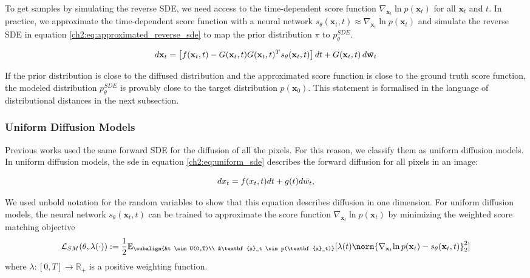 To get samples by simulating the reverse SDE, we need access to the time-dependent score function $\nabla_{\textbf{x}_t}{\ln{p(\textbf{x}_t)}}$ for all $\textbf{x}_t$ and $t$. In practice, we approximate the time-dependent score function with a neural network $s_{\theta}(\textbf{x}_t,t) \approx \nabla_{\textbf{x}_t}{\ln{p(\textbf{x}_t)}}$ and simulate the reverse SDE in equation \ref{ch2:eq:approximated_reverse_sde} to map the prior distribution $\pi$ to $p^{SDE}_{\theta}$.

\begin{equation}
    \label{ch2:eq:approximated_reverse_sde}
    d\mathbf{x}_t = \left[ f(\mathbf{x}_t, t) - G(\mathbf{x}_t, t) G(\mathbf{x}_t, t)^T s_{\theta}(\mathbf{x}_t, t) \right] dt + G(\mathbf{x}_t, t) \, d\Bar{\mathbf{w}_t}
\end{equation}

If the prior distribution is close to the diffused distribution and the approximated score function is close to the ground truth score function, the modeled distribution  $p^{SDE}_{\theta}$ is provably close to the target distribution $p(\textbf{x}_0)$. This statement is formalised in the language of distributional distances in the next subsection.

\subsubsection{Uniform Diffusion Models}
Previous works \cite{ho2020denoising, song2020generative_score, dhariwal2021diffusion_beats_gans} used the same forward SDE for the diffusion of all the pixels. For this reason, we classify them as uniform diffusion models. In uniform diffusion models, the sde in equation \ref{ch2:eq:uniform_sde} describes the forward diffusion for all pixels in an image:

\begin{equation}\label{ch2:eq:uniform_sde}
dx_t=f(x_t,t)dt + g(t)d\Bar{w_t},
\end{equation}

We used unbold notation for the random variables to show that this equation describes diffusion in one dimension. For uniform diffusion models, the neural network $s_\theta(\textbf{x}_t,t)$ can be trained to approximate the score function $\nabla_{\textbf{x}_t}{\ln{p(\textbf{x}_t)}}$ by minimizing the weighted score matching objective
\begin{gather}
    \mathcal{L}_{SM}(\theta, \lambda(\cdot)) := \frac{1}{2} \mathbb{E}_{\subalign{&t \sim U(0,T)\\ &\textbf{x}_t \sim p(\textbf{x}_t)}} [\lambda(t) \norm{\nabla_{\textbf{x}_t}{\ln{p(\textbf{x}_t)}} - s_\theta(\textbf{x}_t,t)}_2^2]
\end{gather}
where $\lambda: [0,T] \xrightarrow{} \mathbb{R}_+$ is a positive weighting function.

